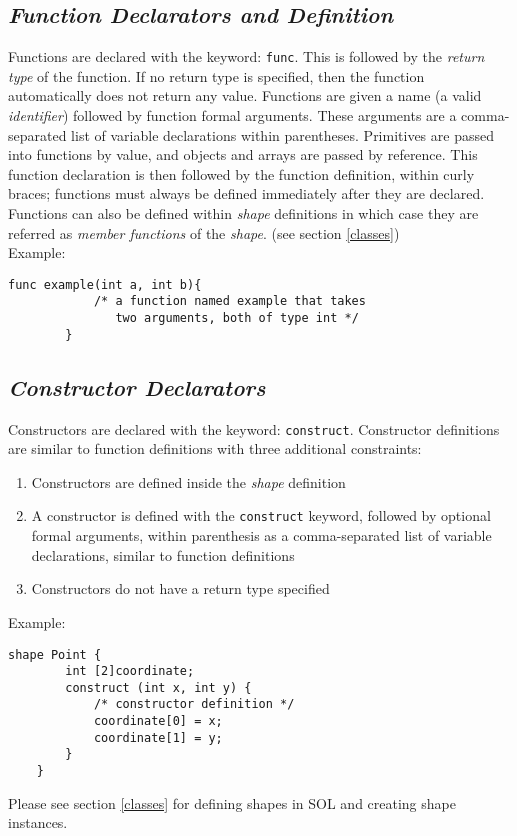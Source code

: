     \subsection{\textit{Function Declarators and Definition}} \label{function}
    Functions are declared with the keyword: \texttt{func}. This is followed by the \textit{return type} of the function. If no return type is specified, then the function automatically does not return any value. Functions are given a name (a valid \textit{identifier}) followed by function formal arguments. These arguments are a comma-separated list of variable declarations within parentheses. Primitives are passed into functions by value, and objects and arrays are passed by reference. This function declaration is then followed by the function definition, within curly braces; functions must always be defined immediately after they are declared.\\
    Functions can also be defined within \textit{shape} definitions in which case they are referred as \textit{member functions} of the \textit{shape}. (see section \ref{classes})\\

    Example:\\
    \begin{lstlisting}[style=sol]
        func example(int a, int b){
            /* a function named example that takes
               two arguments, both of type int */
        }
    \end{lstlisting}

    \subsection{\textit{Constructor Declarators}}
    Constructors are declared with the keyword: \texttt{construct}. Constructor definitions are similar to function definitions with three additional constraints: 
    \begin{enumerate}
        \itemsep0em
        \item Constructors are defined inside the \textit{shape} definition
        \item A constructor is defined with the \texttt{construct} keyword, followed by optional formal arguments, within parenthesis as a comma-separated list of variable declarations, similar to function definitions
        \item Constructors do not have a return type specified
    \end{enumerate}
    Example:\\
    \begin{lstlisting}[style=sol]
    shape Point {
        int [2]coordinate;
        construct (int x, int y) {
            /* constructor definition */
            coordinate[0] = x;
            coordinate[1] = y;
        }
    }
    \end{lstlisting}
    Please see section \ref{classes} for defining shapes in SOL and creating shape instances.

